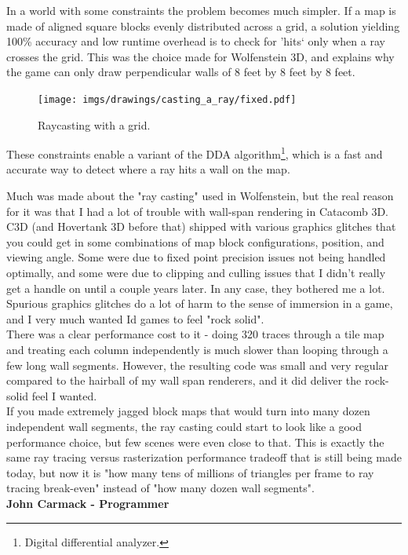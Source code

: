 In a world with some constraints the problem becomes much simpler. If a map is made of aligned square blocks evenly distributed across a grid, a solution yielding 100\% accuracy and low runtime overhead is to check for 'hits` only when a ray crosses the grid. This was the choice made for Wolfenstein 3D, and explains why the game can only draw perpendicular walls of 8 feet by 8 feet by 8 feet.\\
\par
\begin{figure}[H]
\centering
\texttt{[image: imgs/drawings/casting\_a\_ray/fixed.pdf]}
 \caption{Raycasting with a grid.}
\end{figure}
\par
These constraints enable a variant of the DDA algorithm\footnote{Digital differential analyzer.}, which is a fast and accurate way to detect where a ray hits a wall on the map.
\par
\begin{fancyquotes}
\par
Much was made about the "ray casting" used in Wolfenstein, but the real reason for it was that I had a lot of trouble with wall-span rendering in Catacomb 3D.  C3D (and Hovertank 3D before that) shipped with various graphics glitches that you could get in some combinations of map block configurations, position, and viewing angle.  Some were due to fixed point precision issues not being handled optimally, and some were due to clipping and culling issues that I didn't really get a handle on until a couple years later.  In any case, they bothered me a lot.  Spurious graphics glitches do a lot of harm to the sense of immersion in a game, and I very much wanted Id games to feel "rock solid".
 \bigskip \\
There was a clear performance cost to it - doing 320 traces through a tile map and treating each column independently is much slower than looping through a few long wall segments.  However, the resulting code was small and very regular compared to the hairball of my wall span renderers, and it did deliver the rock-solid feel I wanted.
 \bigskip \\
If you made extremely jagged block maps that would turn into many dozen independent wall segments, the ray casting could start to look like a good performance choice, but few scenes were even close to that.  This is exactly the same ray tracing versus rasterization performance tradeoff that is still being made today, but now it is "how many tens of millions of triangles per frame to ray tracing break-even" instead of "how many dozen wall segments".
 \bigskip \\
\textbf{John Carmack - Programmer}
 \end{fancyquotes}



